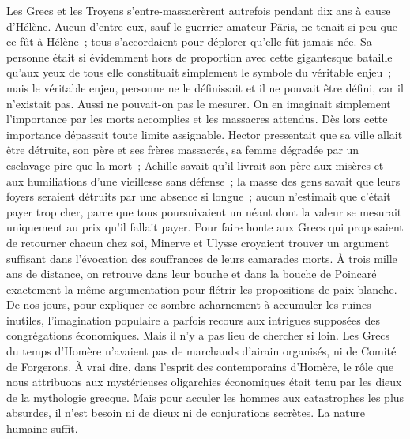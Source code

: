 \documentclass[french,twoside]{book} %
\begin{document}
Les Grecs et les Troyens s'entre-massacrèrent autrefois pendant dix ans à cause d'Hélène. Aucun d'entre eux, sauf le guerrier amateur Pâris, ne tenait si peu que ce fût à Hélène ; tous s'accordaient pour déplorer qu'elle fût jamais née. Sa personne était si évidemment hors de proportion avec cette gigan­tesque bataille qu'aux yeux de tous elle constituait simplement le symbole du véritable enjeu ; mais le véritable enjeu, personne ne le définissait et il ne pouvait être défini, car il n'existait pas. Aussi ne pouvait-on pas le mesurer. On en imaginait simplement l'importance par les morts accomplies et les massacres attendus. Dès lors cette importance dépassait toute limite assi­gnable. Hector pressentait que sa ville allait être détruite, son père et ses frères massacrés, sa femme dégradée par un esclavage pire que la mort ; Achille savait qu'il livrait son père aux misères et aux humiliations d'une vieillesse sans défense ; la masse des gens savait que leurs foyers seraient détruits par une absence si longue ; aucun n'estimait que c'était payer trop cher, parce que tous poursuivaient un néant dont la valeur se mesurait uniquement au prix qu'il fallait payer. Pour faire honte aux Grecs qui proposaient de retourner chacun chez soi, Minerve et Ulysse croyaient trouver un argument suffisant dans l'évocation des souffrances de leurs camarades morts. À trois mille ans de distance, on retrouve dans leur bouche et dans la bouche de Poincaré exactement la même argumentation pour flétrir les propositions de paix blanche. De nos jours, pour expliquer ce sombre acharnement à accumuler les ruines inutiles, l'imagination populaire a parfois recours aux intrigues supposées des congrégations économiques. Mais il n'y a pas lieu de chercher si loin. Les Grecs du temps d'Homère n'avaient pas de marchands d'airain organisés, ni de Comité de Forgerons. À vrai dire, dans l'esprit des contem­porains d'Homère, le rôle que nous attribuons aux mystérieuses oligarchies économiques était tenu par les dieux de la mythologie grecque. Mais pour acculer les hommes aux catastrophes les plus absurdes, il n'est besoin ni de dieux ni de conjurations secrètes. La nature humaine suffit.\par
\end{document}
